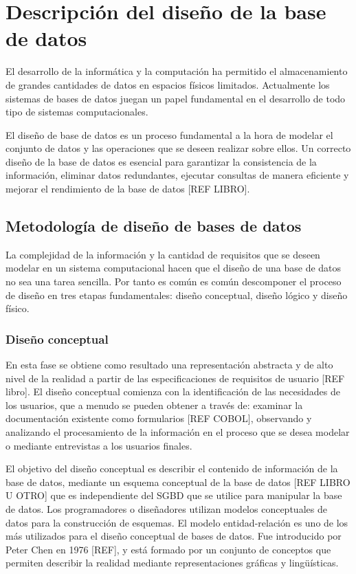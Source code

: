 \chapter{Descripción del diseño de la base de datos}\label{chapter:database}
El desarrollo de la informática y la computación ha permitido
el almacenamiento de grandes cantidades de datos en espacios 
físicos limitados. Actualmente los sistemas de bases de datos juegan
un papel fundamental en el desarrollo de todo tipo de sistemas computacionales.

El diseño de base de datos es un proceso fundamental a la hora 
de modelar el conjunto de datos y las operaciones que se deseen
realizar sobre ellos. Un correcto diseño de la base de datos
es esencial para garantizar la consistencia de la información,
eliminar datos redundantes, ejecutar consultas de manera 
eficiente y mejorar el rendimiento de la base de datos [REF LIBRO]. 

\section{Metodología de diseño de bases de datos}
La complejidad de la información y la cantidad de requisitos que se 
deseen modelar en un sistema computacional hacen que el diseño de una 
base de datos no sea una tarea sencilla. Por tanto es común es común 
descomponer el proceso de diseño en tres etapas fundamentales: diseño conceptual,
diseño lógico y diseño físico. 


\subsection{Diseño conceptual}
En esta fase se obtiene como resultado una representación 
abstracta y de alto nivel de la realidad a partir de las 
especificaciones de requisitos de usuario [REF libro]. El diseño
conceptual comienza con la identificación de las necesidades de los 
usuarios, que a menudo se pueden obtener a través de: examinar
la documentación existente como formularios [REF COBOL], observando y
analizando el procesamiento de la información en el proceso que 
se desea modelar o mediante entrevistas a los usuarios finales.

El objetivo del diseño conceptual es describir el contenido de 
información de la base de datos, mediante un esquema conceptual de
la base de datos [REF LIBRO U OTRO] que es independiente del SGBD
que se utilice para manipular la base de datos.
Los programadores o diseñadores utilizan modelos conceptuales de datos 
para la construcción de esquemas. El modelo entidad-relación es uno 
de los más utilizados para el diseño conceptual de bases de datos. Fue 
introducido por Peter Chen en 1976 [REF], y está formado por 
un conjunto de conceptos que permiten describir la realidad mediante 
representaciones gráficas y lingüísticas.


